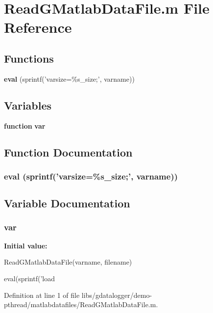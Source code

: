 \section{ReadGMatlabDataFile.m File Reference}
\label{libs_2gdatalogger_2demo-pthread_2matlabdatafiles_2ReadGMatlabDataFile_8m}
\subsection*{Functions}
\begin{DoxyCompactItemize}
\item 
{\bf eval} (sprintf('varsize=\%s\_\-size;', varname))
\end{DoxyCompactItemize}
\subsection*{Variables}
\begin{DoxyCompactItemize}
\item 
{\bf function} {\bf var}
\end{DoxyCompactItemize}


\subsection{Function Documentation}
\subsubsection[{eval}]{\setlength{\rightskip}{0pt plus 5cm}eval (sprintf('varsize=\%s\_\-size;', varname))}\label{libs_2gdatalogger_2demo-pthread_2matlabdatafiles_2ReadGMatlabDataFile_8m_a6f217d64e43fd40c2eb04a81e57d7a1f}


\subsection{Variable Documentation}
\subsubsection[{var}]{ {\bf var}}\label{libs_2gdatalogger_2demo-pthread_2matlabdatafiles_2ReadGMatlabDataFile_8m_a4fdd13e26a831c0dff92f623df42f347}
{\bfseries Initial value:}
\begin{DoxyCode}
 ReadGMatlabDataFile(varname, filename)

eval(sprintf('load %
\end{DoxyCode}


Definition at line 1 of file libs/gdatalogger/demo-\/pthread/matlabdatafiles/ReadGMatlabDataFile.m.